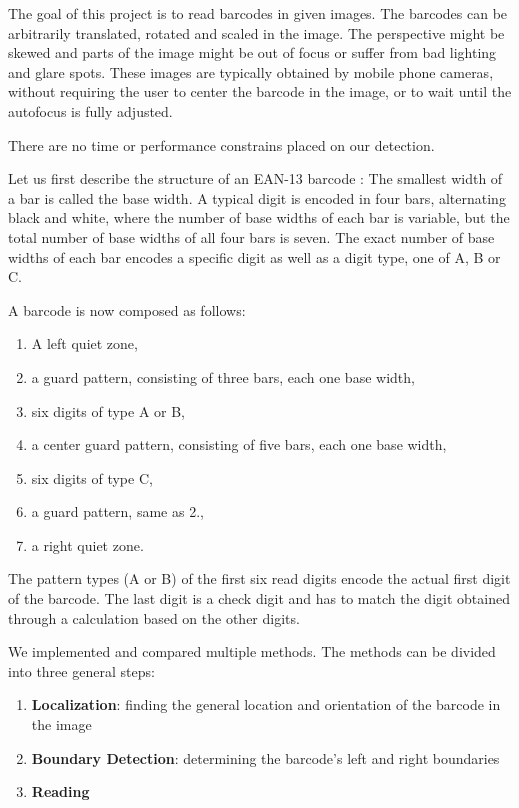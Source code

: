 The goal of this project is to read barcodes in given images. The barcodes can
be arbitrarily translated, rotated and scaled in the image. The perspective
might be skewed and parts of the image might be out of focus or suffer from bad
lighting and glare spots. These images are typically obtained by mobile phone
cameras, without requiring the user to center the barcode in the image, or to
wait until the autofocus is fully adjusted.

There are no time or performance constrains placed on our detection.

Let us first describe the structure of an EAN-13 barcode \cite{GS12017}:
The smallest width of a bar is called the base width. A typical digit is encoded
in four bars, alternating black and white, where the number of base widths
of each bar is variable, but the total number of base widths of all four bars is seven.
The exact number of base widths of each bar encodes a specific digit as well as a digit
type, one of A, B or C.

A barcode is now composed as follows:
\begin{enumerate}
\item A left quiet zone,
\item a guard pattern, consisting of three bars, each one base width,
\item six digits of type A or B,
\item a center guard pattern, consisting of five bars, each one base width,
\item six digits of type C,
\item a guard pattern, same as 2.,
\item a right quiet zone.
\end{enumerate}

The pattern types (A or B) of the first six read digits encode the actual first
digit of the barcode. The last digit is a check digit and has to match the digit
obtained through a calculation based on the other digits.

We implemented and compared multiple methods. The methods can be divided into
three general steps:
\begin{enumerate}
\item \textbf{Localization}: finding the general location and orientation of the barcode
  in the image
\item \textbf{Boundary Detection}: determining the barcode's left and right boundaries
\item \textbf{Reading}
\end{enumerate}

